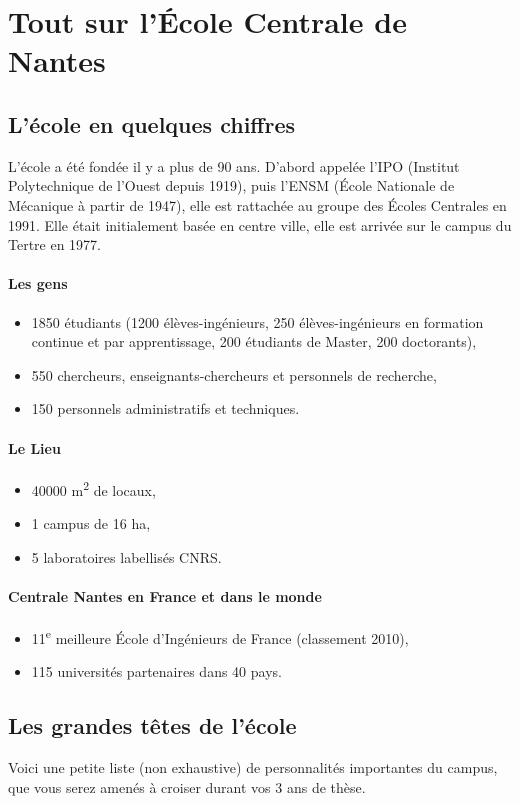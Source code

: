 
\section{Tout sur l'École Centrale de Nantes}\trad
\subsection{L'école en quelques chiffres}\trad
L'école a été fondée il y a plus de 90 ans.
D'abord appelée l'IPO (Institut Polytechnique de l'Ouest depuis 1919), puis l'ENSM (École Nationale de Mécanique à partir de 1947), elle est rattachée au groupe des Écoles Centrales en 1991.
Elle était initialement basée en centre ville, elle est arrivée sur le campus du Tertre en 1977.
\paragraph{Les gens}
\begin{itemize}
  \item 1850 étudiants (1200 élèves-ingénieurs, 250 élèves-ingénieurs en formation continue et par apprentissage, 200 étudiants de Master, 200 doctorants),
  \item 550 chercheurs, enseignants-chercheurs et personnels de recherche,
  \item 150 personnels administratifs et techniques.
\end{itemize}
\paragraph{Le Lieu}
\begin{itemize}
  \item 40000 m\textsuperscript{2} de locaux,
  \item 1 campus de 16 ha,
  \item 5 laboratoires labellisés CNRS.
\end{itemize}
\paragraph{Centrale Nantes en France et dans le monde}
\begin{itemize}
  \item 11\textsuperscript{e} meilleure École d'Ingénieurs de France (classement 2010),
  \item 115 universités partenaires dans 40 pays.
\end{itemize}

\subsection{Les grandes têtes de l'école}\trad
Voici une petite liste (non exhaustive) de personnalités importantes du campus, que vous serez amenés à croiser durant vos 3 ans de thèse.

